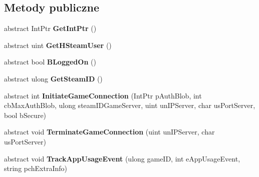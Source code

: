 \subsection*{Metody publiczne}
\begin{DoxyCompactItemize}
\item 
\mbox{\label{class_valve_1_1_steamworks_1_1_i_steam_user_a03641087a3e87977882fff5e28ad488f}} 
abstract Int\+Ptr {\bfseries Get\+Int\+Ptr} ()
\item 
\mbox{\label{class_valve_1_1_steamworks_1_1_i_steam_user_a6fd30c4f036297a6070b7e210de236d7}} 
abstract uint {\bfseries Get\+H\+Steam\+User} ()
\item 
\mbox{\label{class_valve_1_1_steamworks_1_1_i_steam_user_a639e4ff98c9e00e663a45c23b7a1caa5}} 
abstract bool {\bfseries B\+Logged\+On} ()
\item 
\mbox{\label{class_valve_1_1_steamworks_1_1_i_steam_user_a05257ca98d7900a7b6534649dec57b30}} 
abstract ulong {\bfseries Get\+Steam\+ID} ()
\item 
\mbox{\label{class_valve_1_1_steamworks_1_1_i_steam_user_a6000129518ef947cf80f6f92b8e710b4}} 
abstract int {\bfseries Initiate\+Game\+Connection} (Int\+Ptr p\+Auth\+Blob, int cb\+Max\+Auth\+Blob, ulong steam\+I\+D\+Game\+Server, uint un\+I\+P\+Server, char us\+Port\+Server, bool b\+Secure)
\item 
\mbox{\label{class_valve_1_1_steamworks_1_1_i_steam_user_afe59b3cee1c0cbbd3e084f70e1e83d4e}} 
abstract void {\bfseries Terminate\+Game\+Connection} (uint un\+I\+P\+Server, char us\+Port\+Server)
\item 
\mbox{\label{class_valve_1_1_steamworks_1_1_i_steam_user_a224d42cb17ee31d1b7c7051c2b7ba9cc}} 
abstract void {\bfseries Track\+App\+Usage\+Event} (ulong game\+ID, int e\+App\+Usage\+Event, string pch\+Extra\+Info)
\item 
\mbox{\label{class_valve_1_1_steamworks_1_1_i_steam_user_a57163b1abae9de4e23dbb2de9ac82954}} 

\end{DoxyCompactItemize}
